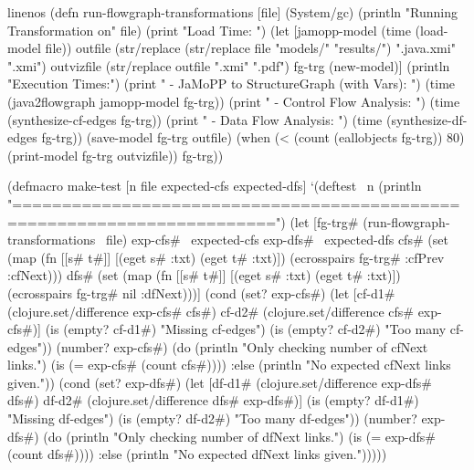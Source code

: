 \documentclass[submission]{eptcs}
\begin{document}
\begin{clojurecode*}{linenos}
(defn run-flowgraph-transformations [file]
  (System/gc)
  (println "Running Transformation on" file)
  (print "Load Time: ")
  (let [jamopp-model (time (load-model file))
        outfile (str/replace (str/replace file "models/" "results/")
                             ".java.xmi" ".xmi")
        outvizfile (str/replace outfile ".xmi" ".pdf")
        fg-trg (new-model)]
    (println "Execution Times:")
    (print "  - JaMoPP to StructureGraph (with Vars): ")
    (time (java2flowgraph jamopp-model fg-trg))
    (print "  - Control Flow Analysis:                ")
    (time (synthesize-cf-edges fg-trg))
    (print "  - Data Flow Analysis:                   ")
    (time (synthesize-df-edges fg-trg))
    (save-model fg-trg outfile)
    (when (< (count (eallobjects fg-trg)) 80)
      (print-model fg-trg outvizfile))
    fg-trg))

(defmacro make-test [n file expected-cfs expected-dfs]
  `(deftest ~n
     (println "========================================================================")
     (let [fg-trg# (run-flowgraph-transformations ~file)
           exp-cfs# ~expected-cfs
           exp-dfs# ~expected-dfs
           cfs# (set (map (fn [[s# t#]] [(eget s# :txt) (eget t# :txt)])
                          (ecrosspairs fg-trg# :cfPrev :cfNext)))
           dfs# (set (map (fn [[s# t#]] [(eget s# :txt) (eget t# :txt)])
                          (ecrosspairs fg-trg# nil :dfNext)))]
       (cond
        (set? exp-cfs#) (let [cf-d1# (clojure.set/difference exp-cfs# cfs#)
                              cf-d2# (clojure.set/difference cfs# exp-cfs#)]
                          (is (empty? cf-d1#) "Missing cf-edges")
                          (is (empty? cf-d2#) "Too many cf-edges"))
        (number? exp-cfs#) (do
                             (println "Only checking number of cfNext links.")
                             (is (= exp-cfs# (count cfs#))))
        :else (println "No expected cfNext links given."))
       (cond
        (set? exp-dfs#) (let [df-d1# (clojure.set/difference exp-dfs# dfs#)
                              df-d2# (clojure.set/difference dfs# exp-dfs#)]
                          (is (empty? df-d1#) "Missing df-edges")
                          (is (empty? df-d2#) "Too many df-edges"))
        (number? exp-dfs#) (do
                             (println "Only checking number of dfNext links.")
                             (is (= exp-dfs# (count dfs#))))
        :else (println "No expected dfNext links given.")))))
\end{clojurecode*}
\end{document}
